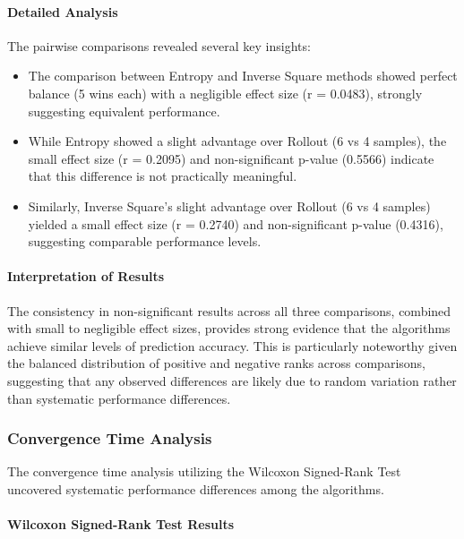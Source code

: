 \documentclass[../report.tex]{subfiles}
\begin{document}
    \paragraph{Detailed Analysis}
    The pairwise comparisons revealed several key insights:
    \begin{itemize}
        \item The comparison between Entropy and Inverse Square methods showed perfect balance (5 wins each) with a negligible effect size (r = 0.0483), strongly suggesting equivalent performance.
        \item While Entropy showed a slight advantage over Rollout (6 vs 4 samples), the small effect size (r = 0.2095) and non-significant p-value (0.5566) indicate that this difference is not practically meaningful.
        \item Similarly, Inverse Square's slight advantage over Rollout (6 vs 4 samples) yielded a small effect size (r = 0.2740) and non-significant p-value (0.4316), suggesting comparable performance levels.
    \end{itemize}

    \vspace{0.3cm}

    \paragraph{Interpretation of Results}
    The consistency in non-significant results across all three comparisons, combined with small to negligible effect sizes, provides strong evidence that the algorithms achieve similar levels of prediction accuracy. This is particularly noteworthy given the balanced distribution of positive and negative ranks across comparisons, suggesting that any observed differences are likely due to random variation rather than systematic performance differences.
    
    \vspace{0.3cm}
    
    \subsubsection{Convergence Time Analysis}

    The convergence time analysis utilizing the Wilcoxon Signed-Rank Test uncovered systematic performance differences among the algorithms.

    \paragraph{Wilcoxon Signed-Rank Test Results}
\end{document}
